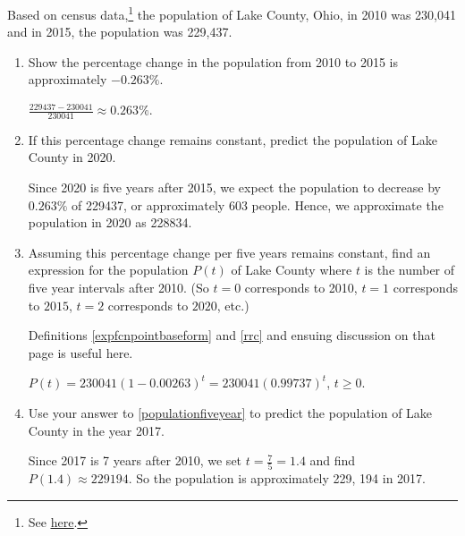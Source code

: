 \documentclass{ximera}
\begin{document}
\begin{problem}
Based on census data,\footnote{See \href{http://www.towncharts.com/Ohio/Demographics/Lake-County-OH-Demographics-data.html}{\underline{here}}.} the population of Lake County, Ohio, in 2010 was 230,041 and in 2015, the population was 229,437.  

\begin{enumerate}

\item  Show the percentage change in the population from 2010 to 2015 is approximately $-0.263 \%$.

\begin{solution}
$\frac{229437-230041}{230041} \approx 0.263 \%$.
\end{solution}

\item  If this percentage change remains constant, predict the population of Lake County in 2020.

\begin{solution}
Since 2020 is five years after 2015, we expect the population to decrease by  $0.263 \%$ of 229437, or approximately 603 people.  Hence, we approximate the population in 2020 as 228834.
\end{solution}

\item  \label{populationfiveyear} Assuming this percentage change per five years remains constant, find an expression for the population $P(t)$ of Lake County where $t$ is the number of five year intervals after 2010.  (So $t = 0$ corresponds to 2010, $t = 1$ corresponds to $2015$, $t = 2$ corresponds to $2020$, etc.)

\begin{hint}
Definitions \ref{expfcnpointbaseform} and \ref{rrc} and ensuing discussion on that page is useful here.
\end{hint}

\begin{solution}
$P(t) = 230041(1-0.00263)^t = 230041(0.99737)^{t}$, $t \geq 0$.
\end{solution}

\item  Use your answer to  \ref{populationfiveyear}  to predict the population of Lake County in the year 2017.  

\begin{solution}
Since 2017 is 7 years after 2010, we set $t = \frac{7}{5} = 1.4$ and find $P(1.4) \approx 229194$.  So the population is approximately 229, 194 in 2017.  
\end{solution}


\end{enumerate}
\end{problem}
\end{document}
